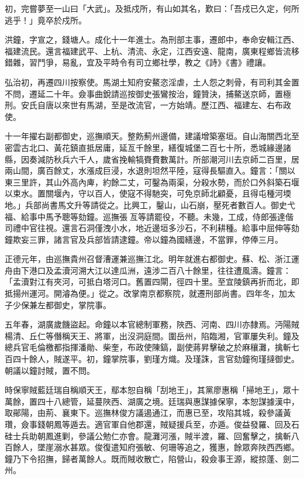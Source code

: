 \begin{pinyinscope}
初，完嘗夢至一山曰「大武」。及抵戍所，有山如其名，歎曰：「吾戍已久定，何所逃乎！」竟卒於戍所。

洪鐘，字宣之，錢塘人。成化十一年進士。為刑部主事，遷郎中，奉命安輯江西、福建流民。還言福建武平、上杭、清流、永定，江西安遠、龍南，廣東程鄉皆流移錯雜，習鬥爭，易亂，宜及平時令有司立鄉社學，教之《詩》《書》禮讓。

弘治初，再遷四川按察使。馬湖土知府安鰲恣淫虐，土人怨之刺骨，有司利其金置不問，遷延二十年。僉事曲銳請巡按御史張鸞按治，鐘贊決，捕鰲送京師，置極刑。安氏自唐以來世有馬湖，至是改流官，一方始靖。歷江西、福建左、右布政使。

十一年擢右副都御史，巡撫順天。整飭薊州邊備，建議增築塞垣。自山海關西北至密雲古北口、黃花鎮直抵居庸，延亙千餘里，繕復城堡二百七十所，悉城緣邊諸縣，因奏減防秋兵六千人，歲省挽輸犒賚費數萬計。所部潮河川去京師二百里，居兩山間，廣百餘丈，水漲成巨浸，水退則坦然平陸，寇得長驅直入。鐘言：「關以東三里許，其山外高內庳，約餘二丈，可鑿為兩渠，分殺水勢，而於口外斜築石堰以束水。置關堰內，守以百人，使寇不得馳突，可免京師北顧憂，且得屯種河堧地。」兵部尚書馬文升等請從之。比興工，鑿山，山石崩，壓死者數百人。御史弋福、給事中馬予聰等劾鐘。巡撫張亙等請罷役，不聽。未幾，工成，侍郎張達偕司禮中官往視。還言石洞僅洩小水，地近邊垣多沙石，不利耕種。給事中屈伸等劾鐘欺妄三罪，諸言官及兵部皆請逮鐘。帝以鐘為國繕邊，不當罪，停俸三月。

正德元年，由巡撫貴州召督漕運兼巡撫江北。明年就進右都御史。蘇、松、浙江運舟由下港口及孟瀆河溯大江以達瓜洲，遠涉二百八十餘里，往往遭風濤。鐘言：「孟瀆對江有夾河，可抵白塔河口。舊置四閘，徑四十里。至宜陵鎮再折而北，即抵揚州運河。開濬為便。」從之。改掌南京都察院，就遷刑部尚書。四年冬，加太子少保兼左都御史，掌院事。

五年春，湖廣歲饑盜起。命鐘以本官總制軍務，陜西、河南、四川亦隸焉。沔陽賊楊清、丘仁等僭稱天王、將軍，出沒洞庭間。圍岳州，陷臨湘，官軍屢失利。鐘及總兵官毛倫檄都指揮潘勛、柴奎，布政使陳鎬，副使蔣昇擊破之於麻穰灘，擒斬七百四十餘人，賊遂平。初，鐘掌院事，劉瑾方熾。及瑾誅，言官劾鐘徇瑾撻御史。朝議以鐘討賊，置不問。

時保寧賊藍廷瑞自稱順天王，鄢本恕自稱「刮地王」，其黨廖惠稱「掃地王」，眾十萬餘，置四十八總管，延蔓陜西、湖廣之境。廷瑞與惠謀據保寧，本恕謀據漢中，取鄖陽，由荊、襄東下。巡撫林俊方議遏通江，而惠已至，攻陷其城，殺參議黃瓚，僉事錢朝鳳等遁去。適官軍自他郡還，賊疑援兵至，亦遁。俊益發羅、回及石硅士兵助朝鳳進剿，參議公勉仁亦會。龍灘河漲，賊半渡，羅、回奮擊之，擒斬八百餘人，墜崖溺水甚眾。俊復遣知府張敏、何珊等追之，獲惠，餘眾奔陜西西鄉。鐘乃下令招撫，歸者萬餘人。既而賊收散亡，陷營山，殺僉事王源，縱掠蓬、劍二州。


\end{pinyinscope}
